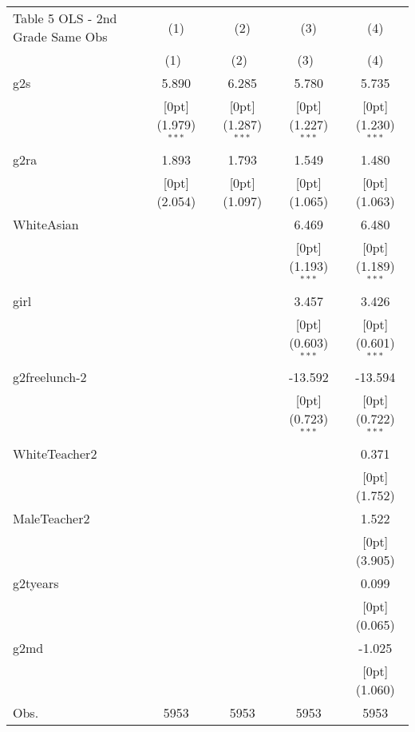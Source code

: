 \documentclass[a4paper,11pt]{article}
\begin{document}
\begin{table}
\small
\begin{tabular*}{\textwidth}{@{\extracolsep{\fill}}lcccc}				
	Table 5 OLS - 2nd Grade Same Obs & \multicolumn{1}{c}{(1)} &	\multicolumn{1}{c}{(2)} &	\multicolumn{1}{c}{(3)} &	\multicolumn{1}{c}{(4)} \\
	\cline{2-5}				
	& \multicolumn{1}{c}{(1)\mbox{\ }} &	\multicolumn{1}{c}{(2)\mbox{\ }} &	\multicolumn{1}{c}{(3)\mbox{\ }} &	\multicolumn{1}{c}{(4)} \\
	\hline				
	g2s &	5.890 &	6.285 &	5.780 &	5.735 \\
	&	\raisebox{.7ex}[0pt]{\scriptsize (1.979)$^{***}$} &	\raisebox{.7ex}[0pt]{\scriptsize (1.287)$^{***}$} &	\raisebox{.7ex}[0pt]{\scriptsize (1.227)$^{***}$} &	\raisebox{.7ex}[0pt]{\scriptsize (1.230)$^{***}$} \\
	g2ra &	1.893 &	1.793 &	1.549 &	1.480 \\
	&	\raisebox{.7ex}[0pt]{\scriptsize (2.054)} &	\raisebox{.7ex}[0pt]{\scriptsize (1.097)} &	\raisebox{.7ex}[0pt]{\scriptsize (1.065)} &	\raisebox{.7ex}[0pt]{\scriptsize (1.063)} \\
	WhiteAsian &	&	&	6.469 &	6.480 \\
	&	&	&	\raisebox{.7ex}[0pt]{\scriptsize (1.193)$^{***}$} &	\raisebox{.7ex}[0pt]{\scriptsize (1.189)$^{***}$} \\
	girl &	&	&	3.457 &	3.426 \\
	&	&	&	\raisebox{.7ex}[0pt]{\scriptsize (0.603)$^{***}$} &	\raisebox{.7ex}[0pt]{\scriptsize (0.601)$^{***}$} \\
	g2freelunch-2 &	&	&	-13.592 &	-13.594 \\
	&	&	&	\raisebox{.7ex}[0pt]{\scriptsize (0.723)$^{***}$} &	\raisebox{.7ex}[0pt]{\scriptsize (0.722)$^{***}$} \\
	WhiteTeacher2 &	&	&	&	0.371 \\
	&	&	&	&	\raisebox{.7ex}[0pt]{\scriptsize (1.752)} \\
	MaleTeacher2 &	&	&	&	1.522 \\
	&	&	&	&	\raisebox{.7ex}[0pt]{\scriptsize (3.905)} \\
	g2tyears &	&	&	&	0.099 \\
	&	&	&	&	\raisebox{.7ex}[0pt]{\scriptsize (0.065)} \\
	g2md &	&	&	&	-1.025 \\
	&	&	&	&	\raisebox{.7ex}[0pt]{\scriptsize (1.060)} \\
	Obs. &	5953 &	5953 &	5953 &	5953 \\
	\hline\hline				
	\end{tabular*}
\end{table}	
\end{document}
